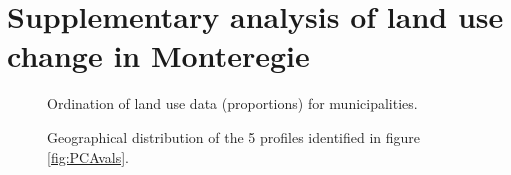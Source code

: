 
\chapter*{\textbf{Supplementary analysis of land use change in Monteregie \\ \hspace{1em}}}

\setcounter{chapter}{5}
\setcounter{table}{0}
\setcounter{figure}{0}




\begin{figure}[h!]
\caption{Ordination of land use data (proportions) for municipalities.}
\label{fig:PCAvals}

\caption{Geographical distribution of the 5 profiles identified in figure \ref{fig:PCAvals}.}
\label{fig:mapvals}
\end{figure}

